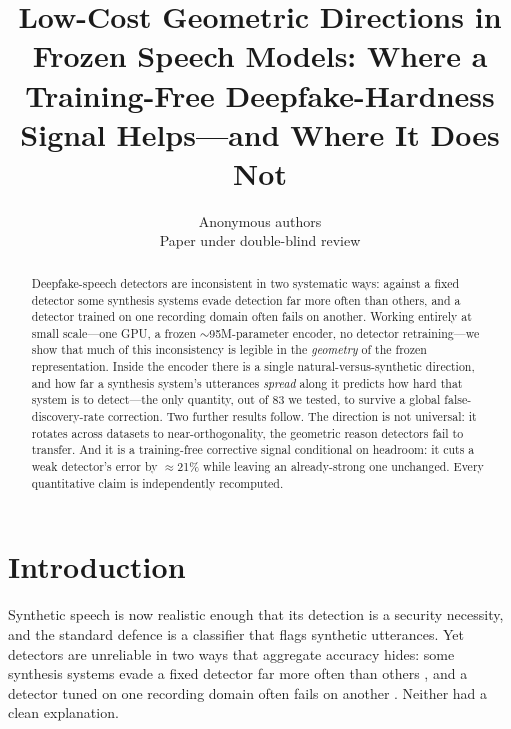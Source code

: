 \documentclass{article}
\title{Low-Cost Geometric Directions in Frozen Speech Models:
Where a Training-Free Deepfake-Hardness Signal Helps---and Where It Does Not}
\author{Anonymous authors\\Paper under double-blind review}
\begin{document}
\linenumbers
\maketitle

\begin{abstract}
Deepfake-speech detectors are inconsistent in two systematic ways: against a fixed
detector some synthesis systems evade detection far more often than others, and a
detector trained on one recording domain often fails on another. Working entirely
at small scale---one GPU, a frozen $\sim$95M-parameter encoder, no detector
retraining---we show that much of this inconsistency is legible in the
\emph{geometry} of the frozen representation. Inside the encoder there is a single
natural-versus-synthetic direction, and how far a synthesis system's utterances
\emph{spread} along it predicts how hard that system is to detect---the only
quantity, out of 83 we tested, to survive a global false-discovery-rate correction.
Two further results follow. The direction is not universal: it rotates across
datasets to near-orthogonality, the geometric reason detectors fail to transfer.
And it is a training-free corrective signal conditional on headroom: it cuts a weak
detector's error by $\approx$21\% while leaving an already-strong one unchanged.
Every quantitative claim is independently recomputed.
\end{abstract}

\section{Introduction}
Synthetic speech is now realistic enough that its detection is a security
necessity, and the standard defence is a classifier that flags synthetic
utterances. Yet detectors are unreliable in two ways that aggregate accuracy hides:
some synthesis systems evade a fixed detector far more often than others
\citep{wang2020asvspoof,muller2024harder}, and a detector tuned on one recording
domain often fails on another \citep{muller2022wild}. Neither had a clean
explanation.
\end{document}
